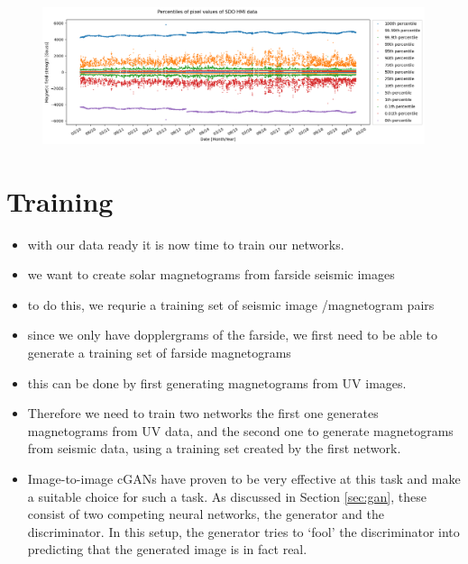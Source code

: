 \documentclass[11pt,a4paper,onecolumn]{report}
\begin{document}
\begin{figure}[t]
  \centering
  \includegraphics[width=\linewidth]{HMI_percentiles.png}
  \caption{}
  \label{fig:hmi_p}
\end{figure}
























%
%
%
%
%
%
%
%
\chapter{Training}
\label{chap:training}
%
%
%
%
%
%
%
%




\begin{itemize}
  \item with our data ready it is now time to train our networks.
  \item we want to create solar magnetograms from farside seismic images
  \item to do this, we requrie a training set of seismic image /magnetogram pairs
  \item since we only have dopplergrams of the farside, we first need to be able
  to generate a training set of farside magnetograms
  \item this can be done by first generating  magnetograms from UV images.
  \item Therefore we need to train two networks the first one generates
  magnetograms from UV data, and the second one to generate magnetograms from
  seismic data, using a training set created by the first network.

  \item Image-to-image cGANs have proven to be very effective at this task and
  make a suitable choice for such a task. As discussed in Section \ref{sec:gan},
  these consist of two competing neural networks, the generator and the
  discriminator. In this setup, the generator tries to `fool' the discriminator into
  predicting that the generated image is in fact real.



\end{itemize}
\end{document}
